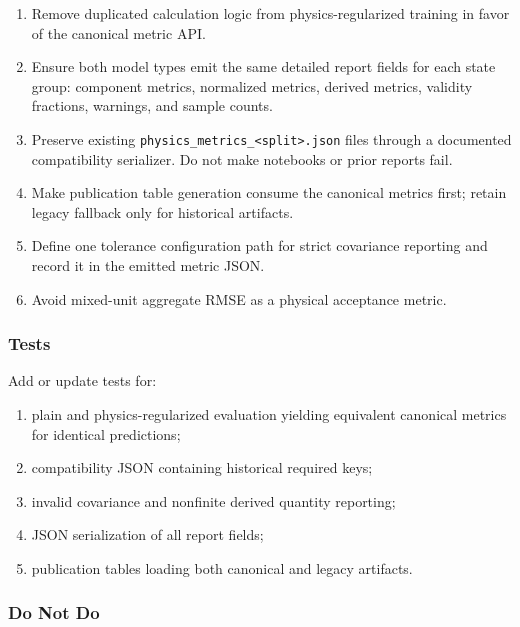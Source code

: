 \documentclass[
]{article}
\providecommand{\tightlist}{%
  \setlength{\itemsep}{0pt}\setlength{\parskip}{0pt}}
\begin{document}
\begin{enumerate}
\def\labelenumi{\arabic{enumi}.}
\tightlist
\item
  Remove duplicated calculation logic from physics-regularized training
  in favor of the canonical metric API.
\item
  Ensure both model types emit the same detailed report fields for each
  state group: component metrics, normalized metrics, derived metrics,
  validity fractions, warnings, and sample counts.
\item
  Preserve existing
  \texttt{physics\_metrics\_\textless{}split\textgreater{}.json} files
  through a documented compatibility serializer. Do not make notebooks
  or prior reports fail.
\item
  Make publication table generation consume the canonical metrics first;
  retain legacy fallback only for historical artifacts.
\item
  Define one tolerance configuration path for strict covariance
  reporting and record it in the emitted metric JSON.
\item
  Avoid mixed-unit aggregate RMSE as a physical acceptance metric.
\end{enumerate}

\hypertarget{tests-11}{%
\subsubsection{Tests}\label{tests-11}}

Add or update tests for:

\begin{enumerate}
\def\labelenumi{\arabic{enumi}.}
\tightlist
\item
  plain and physics-regularized evaluation yielding equivalent canonical
  metrics for identical predictions;
\item
  compatibility JSON containing historical required keys;
\item
  invalid covariance and nonfinite derived quantity reporting;
\item
  JSON serialization of all report fields;
\item
  publication tables loading both canonical and legacy artifacts.
\end{enumerate}

\hypertarget{do-not-do-2}{%
\subsubsection{Do Not Do}\label{do-not-do-2}}
\end{document}
